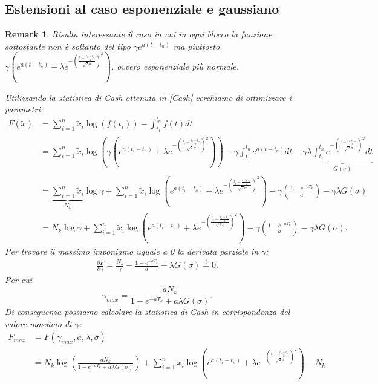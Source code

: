 \documentclass[10pt,a4paper]{report}
\newtheorem{remark}{Remark}
\begin{document}
\subsection{Estensioni al caso esponenziale e gaussiano}
\begin{remark}
Risulta interessante il caso in cui in ogni blocco la funzione sottostante non è soltanto del tipo $\gamma e^{a(t-t_n)}$ ma piuttosto $\gamma\left( e^{a(t-t_n)}+\lambda e^{-\left(\frac{t-\frac{t_1+t_n}{2}}{\sqrt{2}\sigma}\right)^2}\right)$, ovvero esponenziale più normale.

Utilizzando la statistica di Cash ottenuta in \eqref{Cash} cerchiamo di ottimizzare i parametri:
\begin{align*}
F(\tilde{x}) &= \sum_{i=1}^n\tilde{x}_i\log(f(t_i))-\int_{t_1}^{t_n}f(t) dt \\
&= \sum_{i=1}^{n}\tilde{x}_i\log\left(\gamma\left( e^{a(t_i-t_n)}+\lambda e^{-\left(\frac{t_i-\frac{t_1+t_n}{2}}{\sqrt{2}\sigma}\right)^2}\right)\right) - \gamma\int_{t_1}^{t_n}e^{a(t-t_n)} dt - \gamma\lambda\underbrace{\int_{t_1}^{t_n}e^{-\left(\frac{t-\frac{t_1+t_n}{2}}{\sqrt{2}\sigma}\right)^2}dt}_{G(\sigma)}\\
&= \underbrace{\sum_{i=1}^n\tilde{x}_i}_{N_k}\log\gamma + \sum_{i=1}^n\tilde{x}_i\log\left( e^{a(t_i-t_n)}+\lambda e^{-\left(\frac{t_i-\frac{t_1+t_n}{2}}{\sqrt{2}\sigma}\right)^2}\right)-\gamma\left(\frac{1-e^{-aT_k}}{a}\right)-\gamma\lambda G(\sigma)\\
&= N_k\log\gamma + \sum_{i=1}^n\tilde{x}_i\log\left( e^{a(t_i-t_n)}+\lambda e^{-\left(\frac{t_i-\frac{t_1+t_n}{2}}{\sqrt{2}\sigma}\right)^2}\right)-\gamma\left(\frac{1-e^{-aT_k}}{a}\right)-\gamma\lambda G(\sigma).
\end{align*}
Per trovare il massimo imponiamo uguale a 0 la derivata parziale in $\gamma$:
\begin{gather*}
\frac{\partial F}{\partial\gamma} = \frac{N_k}{\gamma}-\frac{1-e^{-aT_k}}{a}-\lambda G(\sigma)\stackrel{!}{=}0.
\end{gather*}
Per cui
$$
\gamma_{max} = \frac{aN_k}{1-e^{-aT_k}+a\lambda G(\sigma)}.
$$
Di conseguenza possiamo calcolare la statistica di Cash in corrispondenza del valore massimo di $\gamma$:
\begin{align*}
F_{max} &= F(\gamma_{max},a,\lambda,\sigma) \\
&= N_k\log\left(\frac{aN_k}{1-e^{-aT_k}+a\lambda G(\sigma)}\right) + \sum_{i=1}^n\tilde{x}_i\log\left( e^{a(t_i-t_n)}+\lambda e^{-\left(\frac{t_i-\frac{t_1+t_n}{2}}{\sqrt{2}\sigma}\right)^2}\right)-N_k.

\end{align*}
\end{remark}
\end{document}
